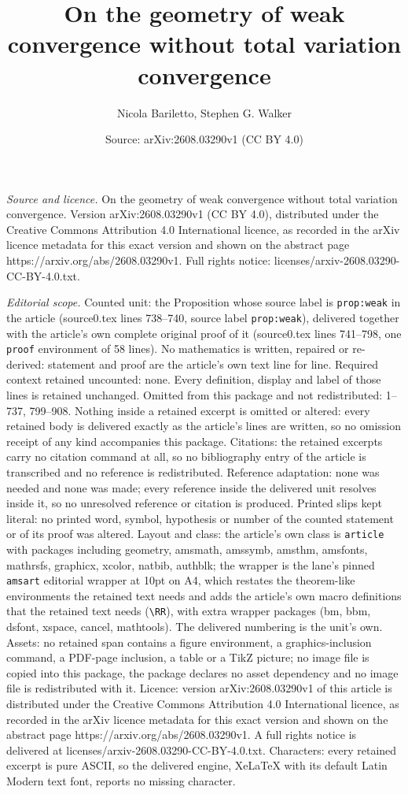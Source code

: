 \documentclass[10pt,a4paper]{amsart}
\title[On the geometry of weak convergence without total variation ]{On the geometry of weak convergence without total variation convergence}
\author{Nicola Bariletto, Stephen G. Walker}
\date{Source: arXiv:2608.03290v1 (CC BY 4.0)}
\begin{document}
\maketitle

\noindent\emph{Source and licence.} On the geometry of weak convergence without total variation convergence. Version arXiv:2608.03290v1 (CC BY 4.0), distributed under the Creative Commons Attribution 4.0 International licence, as recorded in the arXiv licence metadata for this exact version and shown on the abstract page https://arxiv.org/abs/2608.03290v1. Full rights notice: licenses/arxiv-2608.03290-CC-BY-4.0.txt.\par\smallskip

\noindent\textit{Editorial scope.} Counted unit: the Proposition whose source label is \texttt{prop:weak} in the article (source0.tex lines 738--740, source label \texttt{prop:weak}), delivered together with the article's own complete original proof of it (source0.tex lines 741--798, one \texttt{proof} environment of 58 lines). No mathematics is written, repaired or re-derived: statement and proof are the article's own text line for line. Required context retained uncounted: none. Every definition, display and label of those lines is retained unchanged. Omitted from this package and not redistributed: 1--737, 799--908. Nothing inside a retained excerpt is omitted or altered: every retained body is delivered exactly as the article's lines are written, so no omission receipt of any kind accompanies this package. Citations: the retained excerpts carry no citation command at all, so no bibliography entry of the article is transcribed and no reference is redistributed. Reference adaptation: none was needed and none was made; every reference inside the delivered unit resolves inside it, so no unresolved reference or citation is produced. Printed slips kept literal: no printed word, symbol, hypothesis or number of the counted statement or of its proof was altered. Layout and class: the article's own class is \texttt{article} with packages including geometry, amsmath, amssymb, amsthm, amsfonts, mathrsfs, graphicx, xcolor, natbib, authblk; the wrapper is the lane's pinned \texttt{amsart} editorial wrapper at 10pt on A4, which restates the theorem-like environments the retained text needs and adds the article's own macro definitions that the retained text needs (\texttt{\textbackslash RR}), with extra wrapper packages (bm, bbm, dsfont, xspace, cancel, mathtools). The delivered numbering is the unit's own. Assets: no retained span contains a figure environment, a graphics-inclusion command, a PDF-page inclusion, a table or a TikZ picture; no image file is copied into this package, the package declares no asset dependency and no image file is redistributed with it. Licence: version arXiv:2608.03290v1 of this article is distributed under the Creative Commons Attribution 4.0 International licence, as recorded in the arXiv licence metadata for this exact version and shown on the abstract page https://arxiv.org/abs/2608.03290v1. A full rights notice is delivered at licenses/arxiv-2608.03290-CC-BY-4.0.txt. Characters: every retained excerpt is pure ASCII, so the delivered engine, XeLaTeX with its default Latin Modern text font, reports no missing character.
\end{document}
